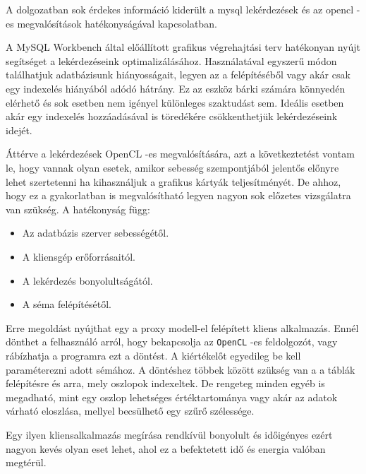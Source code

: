 
A dolgozatban sok érdekes információ kiderült a mysql lekérdezések és az opencl -es megvalósítások hatékonyságával kapcsolatban.

A MySQL Workbench által előállított grafikus végrehajtási terv hatékonyan nyújt segítséget a lekérdezéseink optimalizálásához. Használatával egyszerű módon találhatjuk adatbázisunk hiányosságait, legyen az a felépítéséből vagy akár csak egy indexelés hiányából adódó hátrány. Ez az eszköz bárki számára könnyedén elérhető és sok esetben nem igényel különleges szaktudást sem. Ideális esetben akár egy indexelés hozzáadásával is töredékére csökkenthetjük lekérdezéseink idejét.

Áttérve a lekérdezések OpenCL -es megvalósítására, azt a következtetést vontam le, hogy vannak olyan esetek, amikor sebesség szempontjából jelentős előnyre lehet szertetenni ha kihasználjuk a grafikus kártyák teljesítményét. De ahhoz, hogy ez a gyakorlatban is megvalósítható legyen nagyon sok előzetes vizsgálatra van szükség. A hatékonyság függ:
\begin{itemize}
\item Az adatbázis szerver sebességétől.
\item A kliensgép erőforrásaitól.
\item A lekérdezés bonyolultságától.
\item A séma felépítésétől.
\end{itemize}

Erre megoldást nyújthat egy a proxy modell-el felépített kliens alkalmazás. Ennél dönthet a felhasználó arról, hogy bekapcsolja az \texttt{OpenCL} -es feldolgozót, vagy rábízhatja a programra ezt a döntést. A kiértékelőt egyedileg be kell paraméterezni adott sémához. A döntéshez többek között szükség van a a táblák felépítésre és arra, mely oszlopok indexeltek. De rengeteg minden egyéb is megadható, mint egy oszlop lehetséges értéktartománya vagy akár az adatok várható eloszlása, mellyel becsülhető egy szűrő szélessége. 

Egy ilyen kliensalkalmazás megírása rendkívül bonyolult és időigényes ezért nagyon kevés olyan eset lehet, ahol ez a befektetett idő és energia valóban megtérül. 
